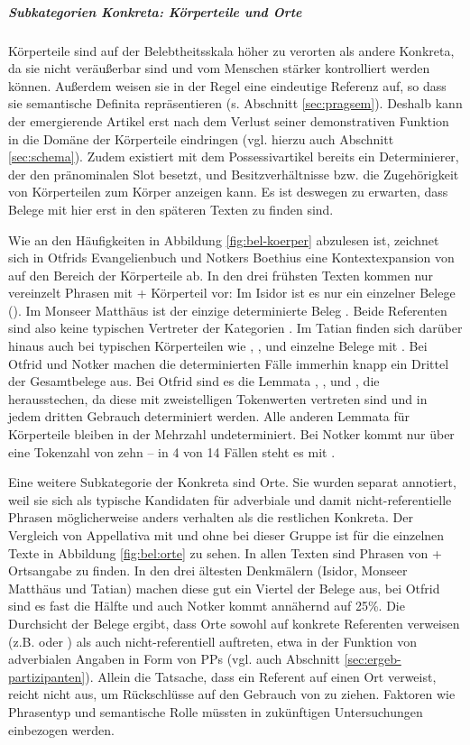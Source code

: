 \subparagraph{Subkategorien Konkreta: Körperteile und Orte}

Körperteile sind auf der Belebtheitsskala höher zu verorten als andere Konkreta, da sie nicht veräußerbar sind und vom Menschen stärker kontrolliert werden können. Außerdem weisen sie in der Regel eine eindeutige Referenz auf, so dass sie semantische Definita repräsentieren (s.  Abschnitt \ref{sec:pragsem}). Deshalb kann der emergierende Artikel erst nach dem Verlust seiner demonstrativen Funktion in die Domäne der Körperteile eindringen (vgl. hierzu auch Abschnitt \ref{sec:schema}). Zudem existiert mit dem Possessivartikel bereits ein Determinierer, der den pränominalen Slot besetzt, und Besitzverhältnisse bzw. die Zugehörigkeit von Körperteilen zum Körper anzeigen kann. Es ist deswegen zu erwarten, dass Belege mit  hier erst in den späteren Texten zu finden sind. 

Wie an den Häufigkeiten in Abbildung \ref{fig:bel-koerper} abzulesen ist, zeichnet sich in Otfrids Evangelienbuch und Notkers Boethius eine  Kontextexpansion von  auf den Bereich der Körperteile ab. 
In den drei frühsten Texten kommen nur vereinzelt Phrasen mit  + Körperteil vor: Im Isidor ist es nur ein einzelner Belege (). Im Monseer Matthäus ist der einzige determinierte Beleg . Beide Referenten sind also keine typischen Vertreter der Kategorien . Im Tatian finden sich darüber hinaus auch bei typischen Körperteilen wie , ,   und  einzelne Belege mit . Bei Otfrid und Notker machen die determinierten Fälle immerhin knapp ein Drittel der Gesamtbelege aus. Bei Otfrid sind es die Lemmata ,  ,   und , die herausstechen, da diese mit zweistelligen Tokenwerten vertreten sind und in jedem dritten Gebrauch determiniert werden. Alle anderen Lemmata für Körperteile bleiben in der Mehrzahl undeterminiert. Bei Notker kommt nur  über eine Tokenzahl von zehn -- in 4 von 14 Fällen steht es mit .

Eine weitere Subkategorie der Konkreta sind Orte. Sie wurden separat annotiert, weil sie sich als typische Kandidaten für adverbiale und damit nicht-referentielle Phrasen möglicherweise anders verhalten als die restlichen Konkreta. Der Vergleich von Appellativa mit und ohne  bei dieser Gruppe ist für die einzelnen Texte in Abbildung \ref{fig:bel:orte} zu sehen. In allen Texten sind Phrasen von  + Ortsangabe zu finden. In den drei ältesten Denkmälern (Isidor, Monseer Matthäus und Tatian) machen diese gut ein Viertel der Belege aus, bei Otfrid sind es fast die Hälfte und auch Notker kommt annähernd auf 25\%. Die Durchsicht der Belege ergibt, dass Orte sowohl auf konkrete Referenten verweisen (z.B.  oder ) als auch nicht-referentiell auftreten, etwa in der Funktion von adverbialen Angaben in Form von PPs (vgl. auch Abschnitt \ref{sec:ergeb-partizipanten}).
Allein die Tatsache, dass ein Referent auf einen Ort verweist, reicht nicht aus, um Rückschlüsse auf den Gebrauch von  zu ziehen. Faktoren wie Phrasentyp und semantische Rolle müssten in zukünftigen Untersuchungen einbezogen werden.  

